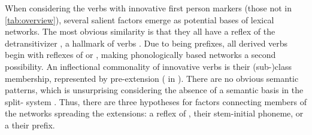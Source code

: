When considering the  verbs with innovative first person markers (those not in \cref{tab:overview}), several salient factors emerge as potential bases of lexical networks.
The most obvious similarity is that they all have a reflex of the detransitivizer \detrz{} , a hallmark of  verbs .
Due to \detrz{} being prefixes, all derived  verbs begin with reflexes of  or  , making phonologically based networks a second possibility.
An inflectional commonality of innovative verbs is their  (sub-)class membership, represented by pre-extension   ( in \akuriyo).
There are no obvious semantic patterns, which is unsurprising considering the absence of a semantic basis in the split- system .
Thus, there are three hypotheses for factors connecting members of the networks spreading the extensions: a reflex of , their stem-initial phoneme, or a their  prefix.

